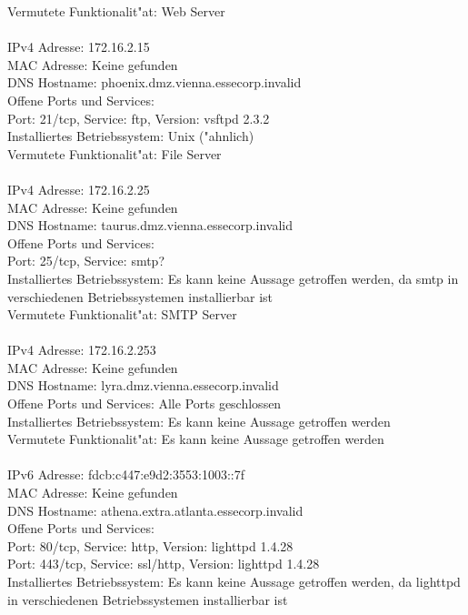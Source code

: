 \documentclass[12pt,a4paper,titlepage,oneside]{scrartcl}
\begin{document}
Vermutete Funktionalit"at: Web Server\\
\\
IPv4 Adresse: 172.16.2.15\\
MAC Adresse: Keine gefunden\\
DNS Hostname: phoenix.dmz.vienna.essecorp.invalid\\
Offene Ports und Services:\\
Port: 21/tcp, Service: ftp, Version: vsftpd 2.3.2\\
Installiertes Betriebssystem: Unix ("ahnlich)\\
Vermutete Funktionalit"at: File Server\\
\\
IPv4 Adresse: 172.16.2.25\\
MAC Adresse: Keine gefunden\\
DNS Hostname: taurus.dmz.vienna.essecorp.invalid\\
Offene Ports und Services:\\
Port: 25/tcp, Service: smtp?\\
Installiertes Betriebssystem: Es kann keine Aussage getroffen werden, da smtp in verschiedenen Betriebssystemen installierbar ist\\
Vermutete Funktionalit"at: SMTP Server\\
\\
IPv4 Adresse: 172.16.2.253\\
MAC Adresse: Keine gefunden\\
DNS Hostname: lyra.dmz.vienna.essecorp.invalid\\
Offene Ports und Services: Alle Ports geschlossen\\
Installiertes Betriebssystem: Es kann keine Aussage getroffen werden\\
Vermutete Funktionalit"at: Es kann keine Aussage getroffen werden\\
\\
IPv6 Adresse: fdcb:c447:e9d2:3553:1003::7f\\
MAC Adresse: Keine gefunden\\
DNS Hostname: athena.extra.atlanta.essecorp.invalid\\
Offene Ports und Services:\\
Port: 80/tcp, Service: http, Version: lighttpd 1.4.28\\
Port: 443/tcp, Service: ssl/http, Version: lighttpd 1.4.28\\
Installiertes Betriebssystem: Es kann keine Aussage getroffen werden, da lighttpd in verschiedenen Betriebssystemen installierbar ist\\
\end{document}
